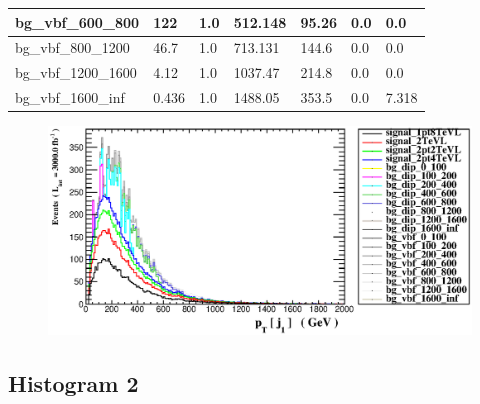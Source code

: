 \documentclass[a4paper, 10pt]{article}
\begin{document}
\begin{table}[H]
\begin{center}
\begin{tabular}{|m{23.0mm}|m{23.0mm}|m{18.0mm}|m{19.0mm}|m{19.0mm}|m{19.0mm}|m{19.0mm}|}
      \hline
      {\cellcolor{white}         bg\_vbf\_600\_800}& {\cellcolor{white}         122}& {\cellcolor{white}         1.0}& {\cellcolor{white}         512.148}& {\cellcolor{white}         95.26}& {\cellcolor{green}         0.0}& {\cellcolor{green}         0.0}\\
      \hline
      {\cellcolor{white}         bg\_vbf\_800\_1200}& {\cellcolor{white}         46.7}& {\cellcolor{white}         1.0}& {\cellcolor{white}         713.131}& {\cellcolor{white}         144.6}& {\cellcolor{green}         0.0}& {\cellcolor{green}         0.0}\\
      \hline
      {\cellcolor{white}         bg\_vbf\_1200\_1600}& {\cellcolor{white}         4.12}& {\cellcolor{white}         1.0}& {\cellcolor{white}         1037.47}& {\cellcolor{white}         214.8}& {\cellcolor{green}         0.0}& {\cellcolor{green}         0.0}\\
      \hline
      {\cellcolor{white}         bg\_vbf\_1600\_inf}& {\cellcolor{white}         0.436}& {\cellcolor{white}         1.0}& {\cellcolor{white}         1488.05}& {\cellcolor{white}         353.5}& {\cellcolor{orange}         0.0}& {\cellcolor{orange}         7.318}\\
\hline
    \end{tabular}
  \end{center}
\end{table}

\begin{figure}[H]
  \begin{center}
    \includegraphics[scale=0.45]{selection_0.eps}\\
\caption{   }
  \end{center}
\end{figure}
      \newpage
\subsection{ Histogram 2}
\end{document}
